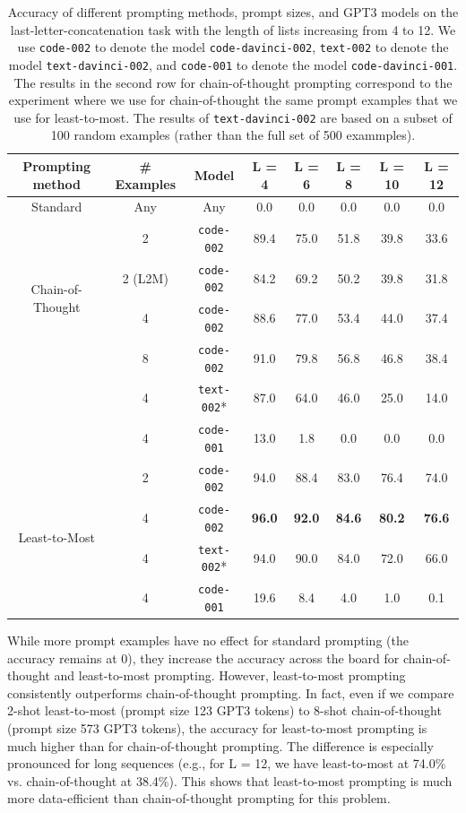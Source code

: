 \begin{table}[h!]
\centering
\begin{tabular}{ |c|c|c|c|c|c|c|c| } 
  \hline
  \textbf{Prompting method} & \textbf{\# Examples} & \textbf{Model} & \textbf{L = 4} & \textbf{L = 6} & \textbf{L = 8} & \textbf{L = 10} & \textbf{L = 12}\\ 
  \hline
  Standard & Any & Any & 0.0 & 0.0 & 0.0 & 0.0 & 0.0\\ 
  \hline
  \multirow{4}{*}{Chain-of-Thought} & 2 & \texttt{code-002} & 89.4 & 75.0 & 51.8 & 39.8 & 33.6\\
  & 2 (L2M) & \texttt{code-002} & 84.2 & 69.2 & 50.2 & 39.8 & 31.8\\
  & 4 & \texttt{code-002} & 88.6 & 77.0 & 53.4 & 44.0 & 37.4\\
  & 8 & \texttt{code-002} & 91.0 & 79.8 & 56.8 & 46.8 & 38.4\\
  & 4 & \texttt{text-002}* & 87.0 & 64.0 & 46.0 & 25.0 & 14.0\\
  & 4 & \texttt{code-001} & 13.0 & 1.8 & 0.0 & 0.0 & 0.0 \\
  \hline
  \multirow{4}{*}{Least-to-Most} & 2 & \texttt{code-002} & 94.0 & 88.4 & 83.0 & 76.4 & 74.0\\ 
  & 4 & \texttt{code-002} &\textbf{96.0} &\textbf{92.0} &\textbf{84.6} &\textbf{80.2} & \textbf{76.6}\\
  & 4 & \texttt{text-002}* & 94.0 & 90.0 & 84.0 & 72.0 & 66.0 \\ 
  & 4 & \texttt{code-001} & 19.6 & 8.4 & 4.0 & 1.0 & 0.1 \\ 
  \hline
\end{tabular}
\vspace{5pt}
\caption{Accuracy of different prompting methods, prompt sizes, and GPT3 models on the last-letter-concatenation task with the length of lists increasing from 4 to 12. We use \texttt{code-002} to denote the model \texttt{code-davinci-002}, \texttt{text-002} to denote the model \texttt{text-davinci-002}, and \texttt{code-001} to denote the model \texttt{code-davinci-001}. The results in the second row for chain-of-thought prompting correspond to the experiment where we use for chain-of-thought the same prompt examples that we use for least-to-most. The results of \texttt{text-davinci-002} are based on a subset of 100 random examples (rather than the full set of 500 exammples).}
\label{table:letter-result-complete}
\end{table}

While more prompt examples have no effect for standard prompting (the accuracy remains at 0), they increase the accuracy across the board for chain-of-thought and least-to-most prompting. However, least-to-most prompting consistently outperforms chain-of-thought prompting. In fact, even if we compare 2-shot least-to-most (prompt size 123 GPT3 tokens) to 8-shot chain-of-thought (prompt size 573 GPT3 tokens), the accuracy for least-to-most prompting is much higher than for chain-of-thought prompting. The difference is especially pronounced for long sequences (e.g., for L = 12, we have least-to-most at 74.0\% vs. chain-of-thought at 38.4\%). This shows that least-to-most prompting is much more data-efficient than chain-of-thought prompting for this problem.

